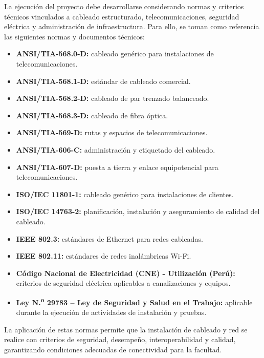 La ejecución del proyecto debe desarrollarse considerando normas y criterios técnicos vinculados a cableado estructurado, telecomunicaciones, seguridad eléctrica y administración de infraestructura. Para ello, se toman como referencia las siguientes normas y documentos técnicos:

\begin{itemize}
    \item \textbf{ANSI/TIA-568.0-D:} cableado genérico para instalaciones de telecomunicaciones.
    \item \textbf{ANSI/TIA-568.1-D:} estándar de cableado comercial.
    \item \textbf{ANSI/TIA-568.2-D:} cableado de par trenzado balanceado.
    \item \textbf{ANSI/TIA-568.3-D:} cableado de fibra óptica.
    \item \textbf{ANSI/TIA-569-D:} rutas y espacios de telecomunicaciones.
    \item \textbf{ANSI/TIA-606-C:} administración y etiquetado del cableado.
    \item \textbf{ANSI/TIA-607-D:} puesta a tierra y enlace equipotencial para telecomunicaciones.
    \item \textbf{ISO/IEC 11801-1:} cableado genérico para instalaciones de clientes.
    \item \textbf{ISO/IEC 14763-2:} planificación, instalación y aseguramiento de calidad del cableado.
    \item \textbf{IEEE 802.3:} estándares de Ethernet para redes cableadas.
    \item \textbf{IEEE 802.11:} estándares de redes inalámbricas Wi-Fi.
    \item \textbf{Código Nacional de Electricidad (CNE) - Utilización (Perú):} criterios de seguridad eléctrica aplicables a canalizaciones y equipos.
    \item \textbf{Ley N.\textsuperscript{o} 29783 -- Ley de Seguridad y Salud en el Trabajo:} aplicable durante la ejecución de actividades de instalación y pruebas.
\end{itemize}

La aplicación de estas normas permite que la instalación de cableado y red se realice con criterios de seguridad, desempeño, interoperabilidad y calidad, garantizando condiciones adecuadas de conectividad para la facultad.
